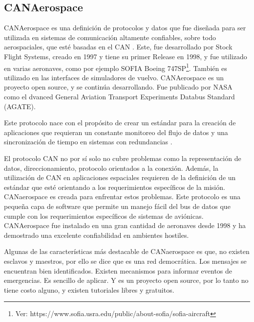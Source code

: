 \subsection{CANAerospace}
CANAerospace es una definición de protocolos y datos que fue diseñada
para ser utilizada en sistemas de comunicación altamente confiables,
sobre todo aerospaciales, que esté basadas en el \ac{CAN}
\citep{CANAerospaceWEB}. Este, fue desarrollado por Stock Flight Systems,
creado en 1997 y tiene su primer Release en 1998, y fue utilizado en varias aeronaves,
como por ejemplo SOFIA Boeing 747SP\footnote{Ver: https://www.sofia.usra.edu/public/about-sofia/sofia-aircraft}.
También es utilizado en las interfaces de simuladores de vuelvo. 
CANAerospace es un proyecto open source, y se continúa desarrollando. Fue
publicado por NASA como el dvanced General Aviation Transport
Experiments Databus Standard (AGATE).

Este protocolo nace con el propósito de crear un estándar para la creación
de aplicaciones que requieran un constante monitoreo del flujo de datos y una
sincronización de tiempo en sistemas con redundancias \cite{CANAerospaceWEB}.


El protocolo CAN no por sí solo no cubre problemas como la representación de datos,
direccionamiento, protocolo orientados a la conexión. Además, la utilización de CAN
en aplicaciones espaciales requieren de la definición de un estándar que esté
orientando a los requerimientos específicos de la misión. CANaerospace es creada
para enfrentar estos problemas. Este protocolo es una pequeña capa de software
que permite un manejo fácil del bus de datos que cumple con los requerimientos
específicos de sistemas de aviónicas. CANAerospace fue instalado en una gran cantidad
de aeronaves desde 1998 y ha demostrado  una excelente confiabilidad en
ambientes hostiles.

Algunas de las características más destacable de CANaerospace es que, no existen
esclavos y maestros, por ello se dice que es una red democrática. Los mensajes
se encuentran bien identificados. Existen mecanismos para informar eventos de
emergencias. Es sencillo de aplicar. Y  es un proyecto open source, por lo tanto
no tiene costo alguno, y existen tutoriales libres y gratuitos.


